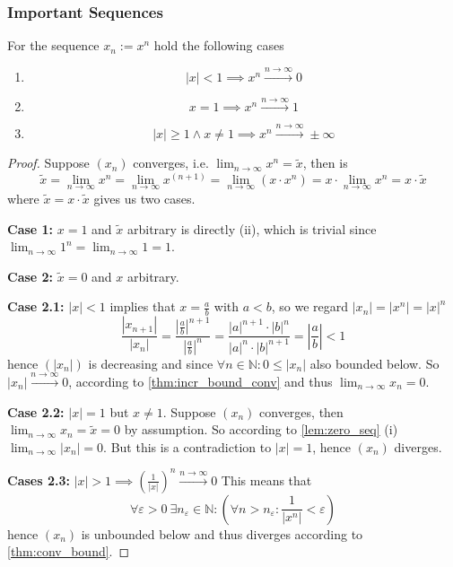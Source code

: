 \subsubsection{Important Sequences}
\begin{proposition}
   For the sequence \(x_n := x^n\) hold the following cases
   \begin{enumerate}[label=\roman*, align=Center]
      \item \[|x| < 1 \implies x^n \xrightarrow{n \to \infty} 0\]
      \item \[x = 1 \implies x^n \xrightarrow{n \to \infty} 1\]
      \item \[|x| \geq 1 \land x \neq 1 \implies x^n \xrightarrow{n \to \infty} \pm\infty\]
   \end{enumerate}
\end{proposition}
\begin{proof}
   Suppose \((x_n)\) converges, i.e. \(\lim_{n \to \infty} x^n = \tilde{x}\), then is
   \[\tilde{x} = \lim_{n \to \infty} x^n = \lim_{n \to \infty} x^{(n+1)} = \lim_{n \to \infty} (x \cdot x^n) = x \cdot \lim_{n \to \infty} x^n = x \cdot \tilde{x}\]
   where \(\tilde{x} = x \cdot \tilde{x}\) gives us two cases.

   \textbf{Case 1:} \(x = 1\) and \(\tilde{x}\) arbitrary is directly (ii), which is trivial since \(\lim_{n \to \infty} 1^n = \lim_{n \to \infty} 1 = 1\).

   \textbf{Case 2:} \(\tilde{x} = 0\) and \(x\) arbitrary.

   \textbf{Case 2.1:} \(|x| < 1\) implies that \(x = \frac{a}{b}\) with \(a < b\), so we regard \(|x_n| = |x^n| = |x|^n\)
   \[\frac{|x_{n+1}|}{|x_n|} = \frac{\left|\frac{a}{b}\right|^{n+1}}{\left|\frac{a}{b}\right|^n} = \frac{|a|^{n+1}\cdot|b|^n}{|a|^n\cdot|b|^{n+1}} = \left|\frac{a}{b}\right| < 1\]
   hence \((|x_n|)\) is decreasing and since \(\forall n \in \mathbb{N}: 0 \leq |x_n|\) also bounded below.
   So \(|x_n| \xrightarrow{n \to \infty} 0\), according to \cref{thm:incr_bound_conv} and thus \(\lim_{n \to \infty} x_n = 0\).

   \textbf{Case 2.2:} \(|x| = 1\) but \(x \neq 1\).
   Suppose \((x_n)\) converges, then \(\lim_{n \to \infty} x_n = \tilde{x} = 0\) by assumption.
   So according to \cref{lem:zero_seq} (i) \(\lim_{n \to \infty} |x_n| = 0\).
   But this is a contradiction to \(|x| = 1\), hence \((x_n)\) diverges.

   \textbf{Cases 2.3:} \(|x| > 1 \implies \left(\frac{1}{|x|}\right)^n \xrightarrow{n \to \infty} 0\)
   This means that
   \[\forall \varepsilon > 0~\exists n_\varepsilon \in \mathbb{N}: \left(\forall n > n_\varepsilon: \frac{1}{|x^n|} < \varepsilon\right)\]
   hence \((x_n)\) is unbounded below and thus diverges according to \cref{thm:conv_bound}.
\end{proof}

